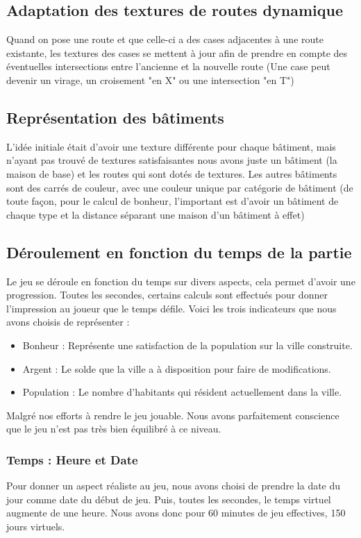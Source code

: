 \documentclass[a4paper,10pt,openany,oneside]{report}
\begin{document}
\subsection{Adaptation des textures de routes dynamique}
Quand on pose une route et que celle-ci a des cases adjacentes à une route existante, les textures des cases se mettent à jour afin de prendre en compte des éventuelles intersections entre l'ancienne et la nouvelle route (Une case peut devenir un virage, un croisement "en X" ou une intersection "en T")
\subsection{Représentation des bâtiments}
L'idée initiale était d'avoir une texture différente pour chaque bâtiment, mais n'ayant pas trouvé de textures satisfaisantes nous avons juste un bâtiment (la maison de base) et les routes qui sont dotés de textures.
\newline
Les autres bâtiments sont des carrés de couleur, avec une couleur unique par catégorie de bâtiment (de toute façon, pour le calcul de bonheur, l'important est d'avoir un bâtiment de chaque type et la distance séparant une maison d'un bâtiment à effet)
\subsection{Déroulement en fonction du temps de la partie}
Le jeu se déroule en fonction du temps sur divers aspects, cela permet d'avoir une progression. Toutes les secondes, certains calculs sont effectués pour donner l'impression au joueur que le temps défile. Voici les trois indicateurs que nous avons choisis de représenter :
\begin{itemize}
	\item Bonheur : Représente une satisfaction de la population sur la ville construite.
	\item Argent : Le solde que la ville a à disposition pour faire de modifications.
	\item Population : Le nombre d'habitants qui résident actuellement dans la ville.
\end{itemize}
Malgré nos efforts à rendre le jeu jouable. Nous avons parfaitement conscience que le jeu n'est pas très bien équilibré à ce niveau.
\subsubsection{Temps : Heure et Date}
Pour donner un aspect réaliste au jeu, nous avons choisi de prendre la date du jour comme date du début de jeu. Puis, toutes les secondes, le temps virtuel augmente de une heure. Nous avons donc pour 60 minutes de jeu effectives, 150 jours virtuels.
\end{document}
